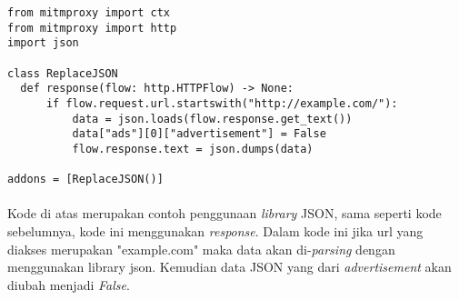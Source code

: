 \documentclass[./bab_3.tex]{subfiles}
\begin{document}
  \begin{verbatim}
from mitmproxy import ctx
from mitmproxy import http
import json

class ReplaceJSON
  def response(flow: http.HTTPFlow) -> None:
      if flow.request.url.startswith("http://example.com/"):
          data = json.loads(flow.response.get_text())
          data["ads"][0]["advertisement"] = False
          flow.response.text = json.dumps(data)

addons = [ReplaceJSON()]
  \end{verbatim}

  \paragraph*{} Kode di atas merupakan contoh penggunaan
  \textit{library} JSON, sama seperti kode sebelumnya, kode
  ini menggunakan \textit{response}. Dalam kode ini jika url
  yang diakses merupakan "example.com" maka data akan
  di-\textit{parsing} dengan menggunakan library json.
  Kemudian data JSON yang dari \textit{advertisement} akan
  diubah menjadi \textit{False}.
\end{document}
